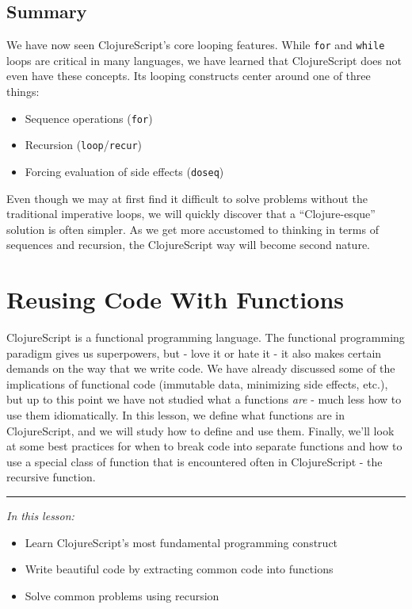 \documentclass[10pt,twoside,openright]{memoir}
\begin{document}
\section{Summary}

We have now seen ClojureScript's core looping features. While
\texttt{for} and \texttt{while} loops are critical in many languages, we
have learned that ClojureScript does not even have these concepts. Its
looping constructs center around one of three things:

\begin{itemize}
\tightlist
\item
  Sequence operations (\texttt{for})
\item
  Recursion (\texttt{loop}/\texttt{recur})
\item
  Forcing evaluation of side effects (\texttt{doseq})
\end{itemize}

Even though we may at first find it difficult to solve problems without
the traditional imperative loops, we will quickly discover that a
``Clojure-esque'' solution is often simpler. As we get more accustomed
to thinking in terms of sequences and recursion, the ClojureScript way
will become second nature.

\chapter{Reusing Code With Functions}

ClojureScript is a functional programming language. The functional
programming paradigm gives us superpowers, but - love it or hate it - it
also makes certain demands on the way that we write code. We have
already discussed some of the implications of functional code (immutable
data, minimizing side effects, etc.), but up to this point we have not
studied what a functions \emph{are} - much less how to use them
idiomatically. In this lesson, we define what functions are in
ClojureScript, and we will study how to define and use them. Finally,
we'll look at some best practices for when to break code into separate
functions and how to use a special class of function that is encountered
often in ClojureScript - the recursive function.

\begin{center}\rule{0.5\linewidth}{0.5pt}\end{center}

\emph{In this lesson:}

\begin{itemize}
\tightlist
\item
  Learn ClojureScript's most fundamental programming construct
\item
  Write beautiful code by extracting common code into functions
\item
  Solve common problems using recursion
\end{itemize}
\end{document}
